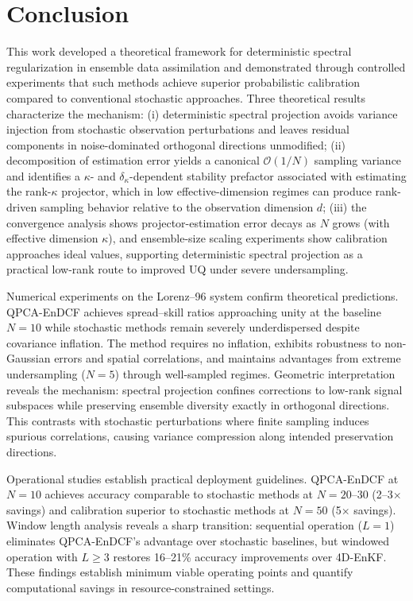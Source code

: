 \documentclass[11pt,a4paper]{article}
\begin{document}
\FloatBarrier


\section{Conclusion}\label{sec:conclusion}

This work developed a theoretical framework for deterministic spectral regularization in ensemble data assimilation and demonstrated through controlled experiments that such methods achieve superior probabilistic calibration compared to conventional stochastic approaches. Three theoretical results characterize the mechanism: (i) deterministic spectral projection avoids variance injection from stochastic observation perturbations and leaves residual components in noise-dominated orthogonal directions unmodified; (ii) decomposition of estimation error yields a canonical $\mathcal{O}(1/N)$ sampling variance and identifies a $\kappa$- and $\delta_\kappa$-dependent stability prefactor associated with estimating the rank-$\kappa$ projector, which in low effective-dimension regimes can produce rank-driven sampling behavior relative to the observation dimension $d$; 
(iii) the convergence analysis shows projector-estimation error decays as $N$ grows (with effective dimension $\kappa$), and ensemble-size scaling experiments show calibration approaches ideal values, supporting deterministic spectral projection as a practical low-rank route to improved UQ under severe undersampling.

Numerical experiments on the Lorenz--96 system confirm theoretical predictions. QPCA-EnDCF achieves spread--skill ratios approaching unity at the baseline $N=10$ while stochastic methods remain severely underdispersed despite covariance inflation. The method requires no inflation, exhibits robustness to non-Gaussian errors and spatial correlations, and maintains advantages from extreme undersampling ($N = 5$) through well-sampled regimes. Geometric interpretation reveals the mechanism: spectral projection confines corrections to low-rank signal subspaces while preserving ensemble diversity exactly in orthogonal directions. This contrasts with stochastic perturbations where finite sampling induces spurious correlations, causing variance compression along intended preservation directions.

Operational studies establish practical deployment guidelines. 
QPCA-EnDCF at $N = 10$ achieves accuracy comparable to stochastic methods at $N = 20$--$30$ (2--3$\times$ savings) and calibration superior to stochastic methods at $N = 50$ (5$\times$ savings). 
Window length analysis reveals a sharp transition: sequential operation ($L = 1$) eliminates QPCA-EnDCF's advantage over stochastic baselines, but windowed operation with $L \geq 3$ restores 16--21\% accuracy improvements over 4D-EnKF. These findings establish minimum viable operating points and quantify computational savings in resource-constrained settings.
\end{document}
